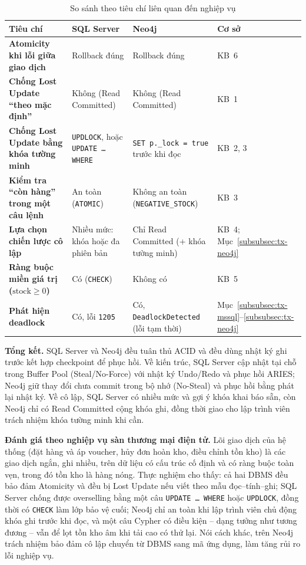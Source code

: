 \begin{table}[htbp]
\centering
\caption{So sánh theo tiêu chí liên quan đến nghiệp vụ}
\label{tab:tx-comparison}
\renewcommand{\arraystretch}{1.25}
\begin{tabularx}{\textwidth}{>{\bfseries}l X X l}
\toprule
Tiêu chí & \textbf{SQL Server} & \textbf{Neo4j} & \textbf{Cơ sở} \\
\midrule
Atomicity khi lỗi giữa giao dịch & Rollback đúng & Rollback đúng & KB~6 \\
Chống Lost Update ``theo mặc định'' & Không (Read Committed) & Không (Read Committed) & KB~1 \\
Chống Lost Update bằng khóa tường minh & \texttt{UPDLOCK}, hoặc \texttt{UPDATE \ldots{} WHERE} & \texttt{SET p.\_lock = true} trước khi đọc & KB~2, 3 \\
Kiểm tra ``còn hàng'' trong một câu lệnh & An toàn (\texttt{ATOMIC}) & Không an toàn (\texttt{NEGATIVE\_STOCK}) & KB~3 \\
Lựa chọn chiến lược cô lập & Nhiều mức: khóa hoặc đa phiên bản & Chỉ Read Committed (+ khóa tường minh) & KB~4; Mục~\ref{subsubsec:tx-neo4j} \\
Ràng buộc miền giá trị ($\text{stock} \ge 0$) & Có (\texttt{CHECK}) & Không có & KB~5 \\
Phát hiện deadlock & Có, lỗi \texttt{1205} & Có, \texttt{DeadlockDetected} (lỗi tạm thời) & Mục~\ref{subsubsec:tx-mssql}--\ref{subsubsec:tx-neo4j} \\
\bottomrule
\end{tabularx}
\end{table}

\textbf{Tổng kết.} SQL Server và Neo4j đều tuân thủ ACID và đều dùng nhật ký ghi trước kết hợp checkpoint để phục hồi. Về kiến trúc, SQL Server cập nhật tại chỗ trong Buffer Pool (Steal/No-Force) với nhật ký Undo/Redo và phục hồi ARIES; Neo4j giữ thay đổi chưa commit trong bộ nhớ (No-Steal) và phục hồi bằng phát lại nhật ký. Về cô lập, SQL Server có nhiều mức và gợi ý khóa khai báo sẵn, còn Neo4j chỉ có Read Committed cộng khóa ghi, đồng thời giao cho lập trình viên trách nhiệm khóa tường minh khi cần.

\textbf{Đánh giá theo nghiệp vụ sàn thương mại điện tử.} Lõi giao dịch của hệ thống (đặt hàng và áp voucher, hủy đơn hoàn kho, điều chỉnh tồn kho) là các giao dịch ngắn, ghi nhiều, trên dữ liệu có cấu trúc cố định và có ràng buộc toàn vẹn, trong đó tồn kho là hàng nóng. Thực nghiệm cho thấy: cả hai DBMS đều bảo đảm Atomicity và đều bị Lost Update nếu viết theo mẫu đọc--tính--ghi; SQL Server chống được overselling bằng một câu \texttt{UPDATE \ldots{} WHERE} hoặc \texttt{UPDLOCK}, đồng thời có \texttt{CHECK} làm lớp bảo vệ cuối; Neo4j chỉ an toàn khi lập trình viên chủ động khóa ghi trước khi đọc, và một câu Cypher có điều kiện -- dạng tưởng như tương đương -- vẫn để lọt tồn kho âm khi tải cao có thử lại. Nói cách khác, trên Neo4j trách nhiệm bảo đảm cô lập chuyển từ DBMS sang mã ứng dụng, làm tăng rủi ro lỗi nghiệp vụ.

